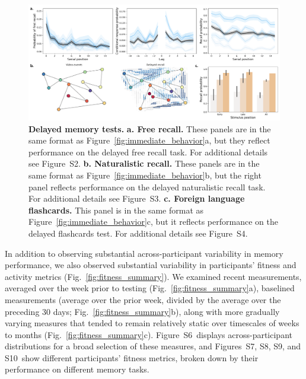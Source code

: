\documentclass[10pt]{article}
\newcommand{\frDetail}{S2}
\newcommand{\natDetail}{S3}
\newcommand{\vocabDetail}{S4}
\newcommand{\fitDists}{S6}
\newcommand{\fitDistgridImmediate}{S7}
\newcommand{\fitScatterImmediate}{S8}
\newcommand{\fitDistgridDelayed}{S9}
\newcommand{\fitScatterDelayed}{S10}
\begin{document}
\begin{figure}[tp]
\centering
\includegraphics[width=1\textwidth]{figs/behavior_overview_delayed}
\caption{\textbf{Delayed memory tests.}  \textbf{a.  Free recall.}
  These panels are in the same format as
  Figure~\ref{fig:immediate_behavior}a, but they reflect performance
  on the delayed free recall task.  For additional details see
  Figure~\frDetail.  \textbf{b. Naturalistic recall.}  These panels
  are in the same format as Figure~\ref{fig:immediate_behavior}b, but
  the right panel reflects performance on the delayed naturalistic
  recall task.  For additional details see Figure~\natDetail.
  \textbf{c. Foreign language flashcards.} This panel is in the same
  format as Figure~\ref{fig:immediate_behavior}c, but it reflects
  performance on the delayed flashcards test.  For additional details
  see Figure~\vocabDetail.}
\label{fig:delayed_behavior}
\end{figure}

In addition to observing substantial across-participant variability in
memory performance, we also observed substantial variability in
participants' fitness and activity metrics
(Fig.~\ref{fig:fitness_summary}).  We examined recent measurements,
averaged over the week prior to testing
(Fig.~\ref{fig:fitness_summary}a), baselined measurements (average
over the prior week, divided by the average over the preceding 30 days;
Fig.~\ref{fig:fitness_summary}b), along with more gradually varying
measures that tended to remain relatively static over timescales of
weeks to months (Fig.~\ref{fig:fitness_summary}c).
Figure~\fitDists~displays across-participant
distributions for a broad selection of these measures, and Figures~\fitDistgridImmediate,
\fitScatterImmediate, \fitDistgridDelayed, and \fitScatterDelayed~show
different participants' fitness metrics, broken down by their
performance on different memory tasks.
\end{document}
